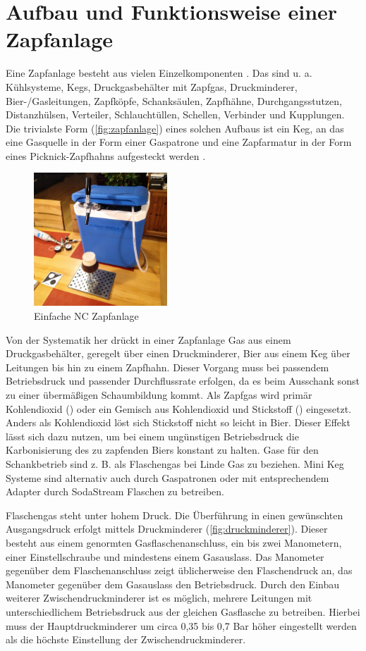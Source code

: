 \documentclass[a4paper,parskip=half]{scrartcl}
\begin{document}
\section*{Aufbau und Funktionsweise einer Zapfanlage}

Eine Zapfanlage besteht aus vielen Einzelkomponenten \autocite{BrewersAssociation2019}. Das sind u. a. Kühlsysteme, Kegs, Druckgasbehälter mit Zapfgas, Druckminderer, Bier-/Gasleitungen, Zapfköpfe, Schanksäulen, Zapfhähne, Durchgangsstutzen, Distanzhülsen, Verteiler, Schlauchtüllen, Schellen, Verbinder und Kupplungen. Die trivialste Form (\autoref{fig:zapfanlage}) eines solchen Aufbaus ist ein Keg, an das eine Gasquelle in der Form einer Gaspatrone und eine Zapfarmatur in der Form eines Picknick-Zapfhahns aufgesteckt werden \autocite{Westemeier1995}.

\begin{figure}[h]
\centering
\includegraphics[width=5cm]{images/zapfanlage.jpg}
\caption{Einfache NC Zapfanlage}
\label{fig:zapfanlage}
\end{figure}

Von der Systematik her drückt in einer Zapfanlage Gas aus einem Druckgasbehälter, geregelt über einen Druckminderer, Bier aus einem Keg über Leitungen bis hin zu einem Zapfhahn. Dieser Vorgang muss bei passendem Betriebsdruck und passender Durchflussrate erfolgen, da es beim Ausschank sonst zu einer übermäßigen Schaumbildung kommt. Als Zapfgas wird primär Kohlendioxid () oder ein Gemisch aus Kohlendioxid und Stickstoff () eingesetzt. Anders als Kohlendioxid löst sich Stickstoff nicht so leicht in Bier. Dieser Effekt lässt sich dazu nutzen, um bei einem ungünstigen Betriebsdruck die Karbonisierung des zu zapfenden Biers konstant zu halten. \autocite{BrewersAssociation2019} Gase für den Schankbetrieb sind z. B. als Flaschengas bei Linde Gas zu beziehen. Mini Keg Systeme sind alternativ auch durch Gaspatronen oder mit entsprechendem Adapter durch SodaStream Flaschen zu betreiben.

Flaschengas steht unter hohem Druck. Die Überführung in einen gewünschten Ausgangsdruck erfolgt mittels Druckminderer (\autoref{fig:druckminderer}). Dieser besteht aus einem genormten Gasflaschenanschluss, ein bis zwei Manometern, einer Einstellschraube und mindestens einem Gasauslass. Das Manometer gegenüber dem Flaschenanschluss zeigt üblicherweise den Flaschendruck an, das Manometer gegenüber dem Gasauslass den Betriebsdruck. Durch den Einbau weiterer Zwischendruckminderer ist es möglich, mehrere Leitungen mit unterschiedlichem Betriebsdruck aus der gleichen Gasflasche zu betreiben. Hierbei muss der Hauptdruckminderer um circa 0,35 bis 0,7 Bar höher eingestellt werden als die höchste Einstellung der Zwischendruckminderer. \autocite{BrewersAssociation2019}
\end{document}
